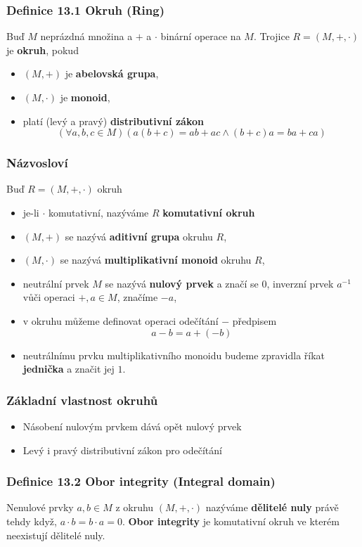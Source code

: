 \documentclass[12pt, letterpaper]{article}
\begin{document}
\subsubsection*{Definice 13.1 Okruh (Ring)}
Buď $M$ neprázdná množina a $+$ a $\cdot$ binární operace na $M$.
Trojice $R = (M,+,\cdot)$ je \textbf{okruh}, pokud
\begin{itemize}
    \item $(M,+)$ je \textbf{abelovská grupa},
    \item $(M,\cdot)$ je \textbf{monoid},
    \item platí (levý a pravý) \textbf{distributivní zákon}
    \[ (\forall a,b,c \in M) \left( a(b+c)= ab + ac \land (b+c)a = ba + ca \right) \]
\end{itemize}

\subsubsection*{Názvosloví}
Buď $R = (M,+,\cdot)$ okruh
\begin{itemize}
    \item je-li $\cdot$ komutativní, nazýváme $R$ \textbf{komutativní okruh}
    \item $(M,+)$ se nazývá \textbf{aditivní grupa} okruhu $R$,
    \item $(M,\cdot)$ se nazývá \textbf{multiplikativní monoid} okruhu $R$,
    \item neutrální prvek $M$ se nazývá \textbf{nulový prvek} a značí se $0$,
    inverzní prvek $a^{-1}$ vůči operaci $+, a \in M$, značíme $-a$,
    \item v okruhu můžeme definovat operaci odečítání $-$ předpisem
    \[ a - b = a + (-b)\]
    \item neutrálnímu prvku multiplikativního monoidu budeme zpravidla říkat \textbf{jednička} a značit jej $1$.
\end{itemize}

\subsubsection*{Základní vlastnost okruhů}
\begin{itemize}
    \item Násobení nulovým prvkem dává opět nulový prvek
    \item Levý i pravý distributivní zákon pro odečítání
\end{itemize}

\subsubsection*{Definice 13.2 Obor integrity (Integral domain)}
Nenulové prvky $a,b \in M$ z okruhu $(M,+,\cdot)$ nazýváme \textbf{dělitelé nuly} právě tehdy když,
$a \cdot b = b \cdot a = 0$. \textbf{Obor integrity} je komutativní okruh ve kterém neexistují dělitelé nuly.
\end{document}
